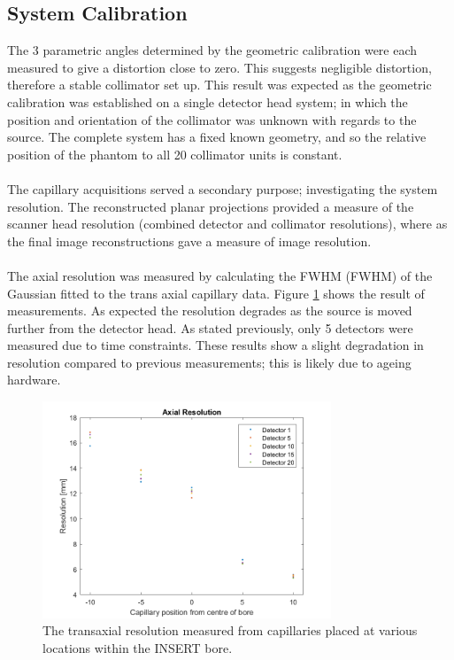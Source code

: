 \subsection{System Calibration}
The 3 parametric angles determined by the geometric calibration were each measured to give a distortion close to zero. This suggests negligible distortion, therefore a stable collimator set up. This result was expected as the geometric calibration was established on a single detector head system; in which the position and orientation of the collimator was unknown with regards to the source. The complete system has a fixed known geometry, and so the relative position of the phantom to all 20 collimator units is constant. 
\paragraph{}
The capillary acquisitions served a secondary purpose; investigating the system resolution. The reconstructed planar projections provided a measure of the scanner head resolution (combined detector and collimator resolutions), where as the final image reconstructions gave a measure of image resolution. 
\paragraph{}
The axial resolution was measured by calculating the \acrlong{FWHM} (\acrshort{FWHM}) of the Gaussian fitted to the trans axial capillary data. Figure \ref{fig:AxialRes} shows the result of measurements. As expected the resolution degrades as the source is moved further from the detector head. As stated previously, only 5 detectors were measured due to time constraints. These results show a slight degradation in resolution compared to previous measurements; this is likely due to ageing hardware. 

\begin{figure}[!t]
\centering
\includegraphics[width=3.4in]{figures/AxialRes.png}
\caption{The transaxial resolution measured from capillaries placed at various locations within the INSERT bore.}
\label{fig:AxialRes}
\end{figure}


